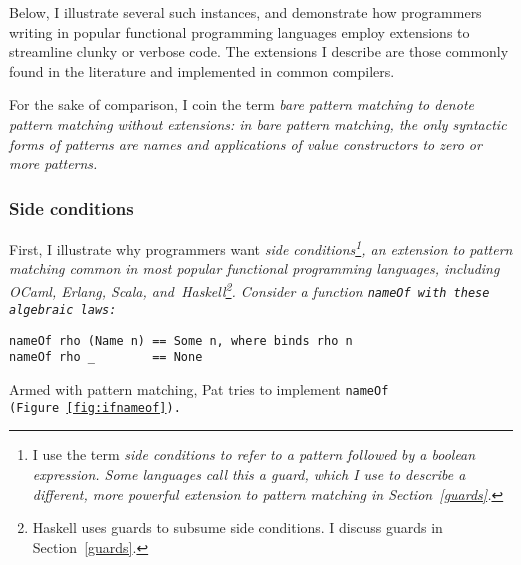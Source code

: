 \documentclass[manuscript,screen,review, 12pt]{acmart}
\begin{document}
    Below, I illustrate several such instances, and demonstrate how programmers
    writing in popular functional programming languages employ extensions to
    streamline clunky or verbose code. The extensions I describe are those
    commonly found in the literature and implemented in common compilers.
    
    For the sake of comparison, I coin the term \it{bare pattern matching} to
    denote pattern matching \it{without} extensions: in bare pattern matching,
    the only syntactic forms of patterns are names and applications of value
    constructors to zero or more patterns. 
    
    

    

\subsubsection{Side conditions}

    First, I illustrate why programmers want \it{side conditions}\footnote{I
    use the term \it{side conditions} to refer to a pattern followed by a
    boolean expression. Some languages call this a \it{guard}, which I use to
    describe a different, more powerful extension to pattern matching in
    Section~\ref{guards}.}, an extension to pattern matching common in most
    popular functional programming languages, including OCaml, Erlang, Scala,
    and~Haskell\footnote{Haskell uses guards to subsume side conditions. I
    discuss guards in Section~\ref{guards}.}. Consider a function \tt{nameOf}
    with these algebraic laws: 

    \begin{minipage}[t]{\textwidth}
        \centering 
        \begin{verbatim}
nameOf rho (Name n) == Some n, where binds rho n
nameOf rho _        == None 
        \end{verbatim}
    \end{minipage}

    Armed with pattern matching, Pat tries to implement \tt{nameOf}
    (Figure~\ref{fig:ifnameof}).
\end{document}
